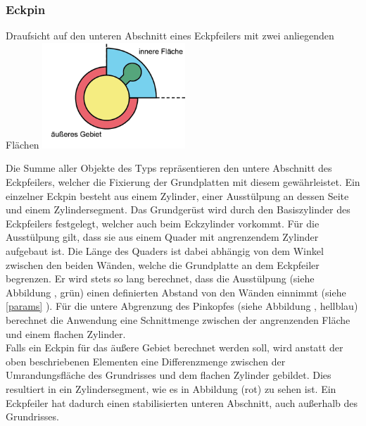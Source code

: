 \subsubsection{Eckpin}
\label{Eckpin}
\begin{Bild}{Draufsicht auf den unteren Abschnitt eines Eckpfeilers mit zwei anliegenden Flächen}
	\includegraphics[height=150px]{Bilder/CornerPin2D-07.png}
\end{Bild}
Die Summe aller Objekte des Typs  repräsentieren den untere Abschnitt des Eckpfeilers, welcher die Fixierung der Grundplatten mit diesem gewährleistet.
Ein einzelner Eckpin besteht aus einem Zylinder, einer Ausstülpung an dessen Seite und einem Zylindersegment.
Das Grundgerüst wird durch den Basiszylinder des Eckpfeilers festgelegt, welcher auch beim Eckzylinder vorkommt.
Für die Ausstülpung gilt, dass sie aus einem Quader mit angrenzendem Zylinder aufgebaut ist.
Die Länge des Quaders ist dabei abhängig von dem Winkel zwischen den beiden Wänden, welche die Grundplatte an dem Eckpfeiler begrenzen.
Er wird stets so lang berechnet, dass die Ausstülpung (siehe Abbildung \thebildnr, grün) einen definierten Abstand von den Wänden einnimmt (siehe \ref{params} ).
Für die untere Abgrenzung des Pinkopfes (siehe Abbildung \thebildnr, hellblau) berechnet die Anwendung eine Schnittmenge zwischen der angrenzenden Fläche und einem flachen Zylinder.\\
Falls ein Eckpin für das äußere Gebiet berechnet werden soll, wird anstatt der oben beschriebenen Elementen eine Differenzmenge zwischen der Umrandungsfläche des Grundrisses und dem flachen Zylinder gebildet.
Dies resultiert in ein Zylindersegment, wie es in Abbildung \thebildnr (rot) zu sehen ist.
Ein Eckpfeiler hat dadurch einen stabilisierten unteren Abschnitt, auch außerhalb des Grundrisses.


